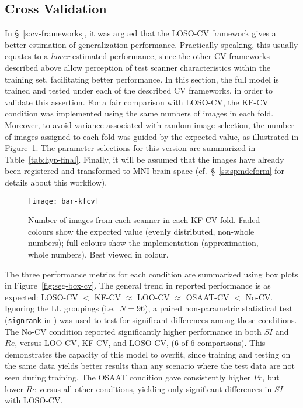 \subsection{Cross Validation}\label{ss:exp-cv}
In \S~\ref{s:cv-frameworks}, it was argued that the LOSO-CV framework
gives a better estimation of generalization performance.
Practically speaking, this usually equates to a \textit{lower} estimated performance,
since the other CV frameworks described above allow perception of test scanner characteristics
within the training set, facilitating better performance.
In this section, the full model is trained and tested under each of the described CV frameworks,
in order to validate this assertion.
For a fair comparison with LOSO-CV, the KF-CV condition was implemented
using the same numbers of images in each fold.
Moreover, to avoid variance associated with random image selection,
the number of images assigned to each fold was guided by the expected value,
as illustrated in Figure~\ref{fig:bar-kfcv}.
The parameter selections for this version are summarized in Table~\ref{tab:hyp-final}.
Finally, it will be assumed that
the images have already been registered and transformed to MNI brain space
(cf.~\S~\ref{ss:spmdeform} for details about this workflow).
\par
\begin{figure}
  \centering
  \texttt{[image: bar-kfcv]}
  \caption{Number of images from each scanner in each KF-CV fold.
    Faded colours show the expected value (evenly distributed, non-whole numbers);
    full colours show the implementation (approximation, whole numbers).
    Best viewed in colour.}%
  \label{fig:bar-kfcv}
\end{figure}
The three performance metrics for each condition are
summarized using box plots in Figure~\ref{fig:seg-box-cv}.
The general trend in reported performance is as expected:
LOSO-CV $<$ KF-CV $\approx$ LOO-CV $\approx$ OSAAT-CV $<$ No-CV.
Ignoring the LL groupings (i.e.\ $N = 96$),
a paired non-parametric statistical test (\texttt{signrank} in \matlab)
was used to test for significant differences among these conditions.
The No-CV condition reported significantly higher performance in both $SI$ and $Re$,
versus LOO-CV, KF-CV, and LOSO-CV, (6 of 6 comparisons).
This demonstrates the capacity of this model to overfit,
since training and testing on the same data yields better results
than any scenario where the test data are not seen during training.
The OSAAT condition gave consistently higher $Pr$, but lower $Re$ %
versus all other conditions, yielding only significant differences in $SI$ with LOSO-CV.
